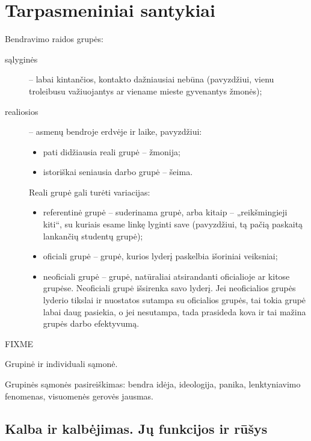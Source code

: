 \chapter{Tarpasmeniniai santykiai}

\label{tema:grupe}

Bendravimo raidos grupės:

\begin{description}
  \item[sąlyginės] – labai kintančios, kontakto dažniausiai nebūna 
    (pavyzdžiui, vienu troleibusu važiuojantys ar viename mieste gyvenantys 
    žmonės);
  \item[realiosios] – asmenų bendroje erdvėje ir laike, pavyzdžiui:
    \begin{itemize}
      \item pati didžiausia reali grupė – žmonija;
      \item istoriškai seniausia darbo grupė – šeima.
    \end{itemize}

    Reali grupė gali turėti variacijas:
    \begin{itemize}
      \item referentinė grupė – suderinama grupė, arba kitaip –
        „reikšmingieji kiti“, su kuriais esame linkę lyginti save 
        (pavyzdžiui, tą pačią paskaitą lankančių studentų grupė);
      \item oficiali grupė – grupė, kurios lyderį paskelbia išoriniai
        veiksniai;
      \item neoficiali grupė – grupė, natūraliai atsirandanti oficialioje
        ar kitose grupėse. Neoficiali grupė išsirenka savo lyderį. Jei
        neoficialios grupės lyderio tikslai ir nuostatos sutampa su
        oficialios grupės, tai tokia grupė labai daug pasiekia, o jei
        nesutampa, tada prasideda kova ir tai mažina grupės darbo 
        efektyvumą.
    \end{itemize}

\end{description}


FIXME

Grupinė ir individuali sąmonė.

Grupinės sąmonės pasireiškimas: bendra idėja, ideologija,
panika, lenktyniavimo fenomenas, visuomenės gerovės jausmas.

\section{Kalba ir kalbėjimas. Jų funkcijos ir rūšys}

